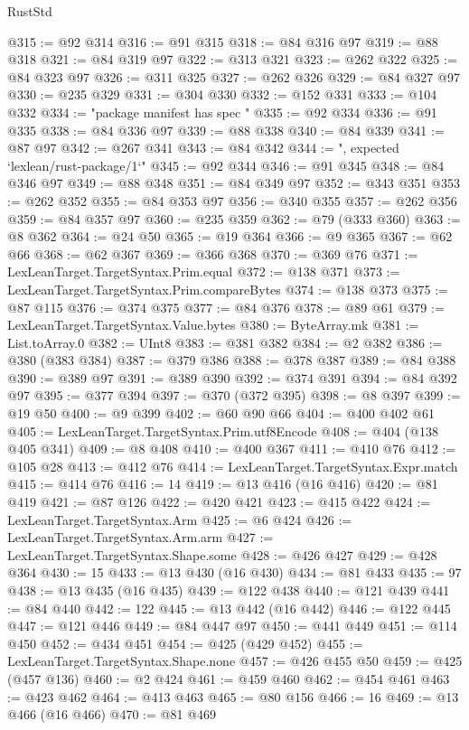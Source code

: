 \begin{lexlean}{RustStd}
\begin{coremodule}
@315 := @92 @314
@316 := @91 @315
@318 := @84 @316 @97
@319 := @88 @318
@321 := @84 @319 @97
@322 := @313 @321
@323 := @262 @322
@325 := @84 @323 @97
@326 := @311 @325
@327 := @262 @326
@329 := @84 @327 @97
@330 := @235 @329
@331 := @304 @330
@332 := @152 @331
@333 := @104 @332
@334 := "package manifest has spec "
@335 := @92 @334
@336 := @91 @335
@338 := @84 @336 @97
@339 := @88 @338
@340 := @84 @339
@341 := @87 @97
@342 := @267 @341
@343 := @84 @342
@344 := ", expected `lexlean/rust-package/1`"
@345 := @92 @344
@346 := @91 @345
@348 := @84 @346 @97
@349 := @88 @348
@351 := @84 @349 @97
@352 := @343 @351
@353 := @262 @352
@355 := @84 @353 @97
@356 := @340 @355
@357 := @262 @356
@359 := @84 @357 @97
@360 := @235 @359
@362 := @79 (@333 @360)
@363 := @8 @362
@364 := @24 @50
@365 := @19 @364
@366 := @9 @365
@367 := @62 @66
@368 := @62 @367
@369 := @366 @368
@370 := @369 @76
@371 := LexLeanTarget.TargetSyntax.Prim.equal
@372 := @138 @371
@373 := LexLeanTarget.TargetSyntax.Prim.compareBytes
@374 := @138 @373
@375 := @87 @115
@376 := @374 @375
@377 := @84 @376
@378 := @89 @61
@379 := LexLeanTarget.TargetSyntax.Value.bytes
@380 := ByteArray.mk
@381 := List.toArray.{0}
@382 := UInt8
@383 := @381 @382
@384 := @2 @382
@386 := @380 (@383 @384)
@387 := @379 @386
@388 := @378 @387
@389 := @84 @388
@390 := @389 @97
@391 := @389 @390
@392 := @374 @391
@394 := @84 @392 @97
@395 := @377 @394
@397 := @370 (@372 @395)
@398 := @8 @397
@399 := @19 @50
@400 := @9 @399
@402 := @60 @90 @66
@404 := @400 @402 @61
@405 := LexLeanTarget.TargetSyntax.Prim.utf8Encode
@408 := @404 (@138 @405 @341)
@409 := @8 @408
@410 := @400 @367
@411 := @410 @76
@412 := @105 @28
@413 := @412 @76
@414 := LexLeanTarget.TargetSyntax.Expr.match
@415 := @414 @76
@416 := 14
@419 := @13 @416 (@16 @416)
@420 := @81 @419
@421 := @87 @126
@422 := @420 @421
@423 := @415 @422
@424 := LexLeanTarget.TargetSyntax.Arm
@425 := @6 @424
@426 := LexLeanTarget.TargetSyntax.Arm.arm
@427 := LexLeanTarget.TargetSyntax.Shape.some
@428 := @426 @427
@429 := @428 @364
@430 := 15
@433 := @13 @430 (@16 @430)
@434 := @81 @433
@435 := 97
@438 := @13 @435 (@16 @435)
@439 := @122 @438
@440 := @121 @439
@441 := @84 @440
@442 := 122
@445 := @13 @442 (@16 @442)
@446 := @122 @445
@447 := @121 @446
@449 := @84 @447 @97
@450 := @441 @449
@451 := @114 @450
@452 := @434 @451
@454 := @425 (@429 @452)
@455 := LexLeanTarget.TargetSyntax.Shape.none
@457 := @426 @455 @50
@459 := @425 (@457 @136)
@460 := @2 @424
@461 := @459 @460
@462 := @454 @461
@463 := @423 @462
@464 := @413 @463
@465 := @80 @156
@466 := 16
@469 := @13 @466 (@16 @466)
@470 := @81 @469

\end{coremodule}
\end{lexlean}
